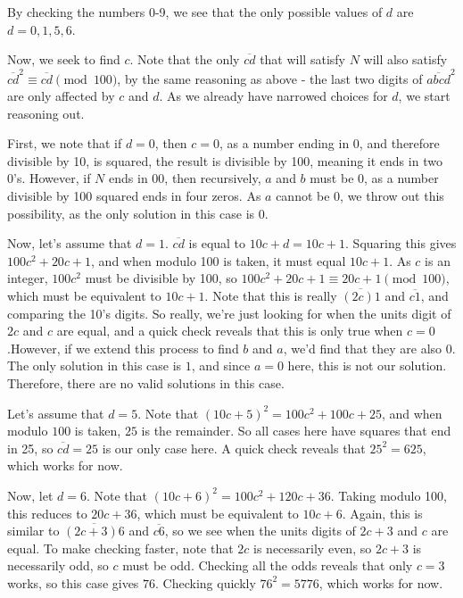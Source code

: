 \begin{enumerate}
 By checking the numbers 0-9, we see that the only possible values of $d$ are $d=0, 1, 5, 6$.

 Now, we seek to find $c$. Note that the only $\overline{cd}$ that will satisfy $N$ will also satisfy $\overline{cd}^2 \equiv \overline{cd}\pmod{100}$, by the same reasoning as above - the last two digits of $\overline{abcd}^2$ are only affected by $c$ and $d$. As we already have narrowed choices for $d$, we start reasoning out.

 First, we note that if $d=0$, then $c=0$, as a number ending in 0, and therefore divisible by 10, is squared, the result is divisible by 100, meaning it ends in two 0's. However, if $N$ ends in $00$, then recursively, $a$ and $b$ must be $0$, as a number divisible by 100 squared ends in four zeros. As $a$ cannot be 0, we throw out this possibility, as the only solution in this case is $0$.

 Now, let's assume that $d=1$. $\overline{cd}$ is equal to $10c + d = 10c + 1$. Squaring this gives $100c^2 + 20c + 1$, and when modulo 100 is taken, it must equal $10c + 1$. As $c$ is an integer, $100c^2$ must be divisible by 100, so $100c^2+20c+1 \equiv 20c + 1\pmod{100}$, which must be equivalent to $10c + 1$. Note that this is really $\overline{(2c)1}$ and $\overline{c1}$, and comparing the 10's digits. So really, we're just looking for when the units digit of $2c$ and $c$ are equal, and a quick check reveals that this is only true when $c=0$.However, if we extend this process to find $b$ and $a$, we'd find that they are also 0. The only solution in this case is $1$, and since $a=0$ here, this is not our solution. Therefore, there are no valid solutions in this case.

 Let's assume that $d=5$. Note that $(10c + 5)^2 = 100c^2 + 100c + 25$, and when modulo $100$ is taken, $25$ is the remainder. So all cases here have squares that end in 25, so $\overline{cd}=25$ is our only case here. A quick check reveals that $25^2=625$, which works for now.

 Now, let $d=6$. Note that $(10c + 6)^2 = 100c^2 + 120c + 36$. Taking modulo 100, this reduces to $20c+36$, which must be equivalent to $10c+6$. Again, this is similar to $\overline{(2c+3)6}$ and $\overline{c6}$, so we see when the units digits of $2c+3$ and $c$ are equal. To make checking faster, note that $2c$ is necessarily even, so $2c+3$ is necessarily odd, so $c$ must be odd. Checking all the odds reveals that only $c=3$ works, so this case gives $76$. Checking quickly $76^2 = 5776$, which works for now.


\end{enumerate}
